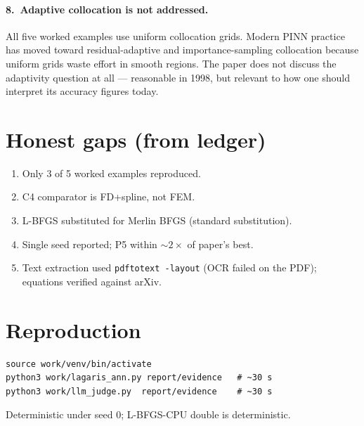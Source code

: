 \documentclass[11pt]{article}
\begin{document}
\paragraph{8.\ Adaptive collocation is not addressed.}
All five worked examples use uniform collocation grids. Modern PINN practice
has moved toward residual-adaptive and importance-sampling collocation because
uniform grids waste effort in smooth regions. The paper does not discuss the
adaptivity question at all --- reasonable in 1998, but relevant to how one
should interpret its accuracy figures today.

\section{Honest gaps (from ledger)}
\begin{enumerate}
\item Only 3 of 5 worked examples reproduced.
\item C4 comparator is FD+spline, not FEM.
\item L-BFGS substituted for Merlin BFGS (standard substitution).
\item Single seed reported; P5 within $\sim 2\times$ of paper's best.
\item Text extraction used \texttt{pdftotext -layout} (OCR failed on the PDF);
      equations verified against arXiv.
\end{enumerate}

\section{Reproduction}
\begin{verbatim}
source work/venv/bin/activate
python3 work/lagaris_ann.py report/evidence   # ~30 s
python3 work/llm_judge.py  report/evidence    # ~30 s
\end{verbatim}
Deterministic under seed 0; L-BFGS-CPU double is deterministic.
\end{document}
